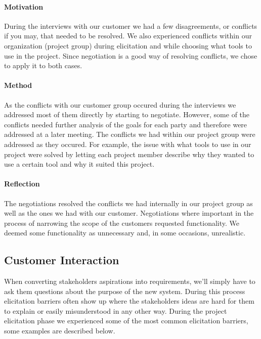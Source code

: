 \documentclass[10pt]{article}
\begin{document}
\paragraph{Motivation}
\hfill \break
During the interviews with our customer we had a few disagreements, or conflicts if you may, that needed to be resolved. We also experienced conflicts within our organization (project group) during elicitation and while choosing what tools to use in the project. Since negotiation is a good way of resolving conflicts, we chose to apply it to both cases.
\paragraph{Method}
\hfill \break
As the conflicts with our customer group occured during the interviews we addressed most of them directly by starting to negotiate. However, some of the conflicts needed further analysis of the goals for each party and therefore were addressed at a later meeting. The conflicts we had within our project group were addressed as they occured. For example, the issue with what tools to use in our project were solved by letting each project member describe why they wanted to use a certain tool and why it suited this project. 

\paragraph{Reflection}
\hfill \break
The negotiations resolved the conflicts we had internally in our project group as well as the ones we had with our customer. Negotiations where important in the process of narrowing the scope of the customers requested functionality. We deemed some functionality as unnecessary and, in some occasions, unrealistic.


\subsection{Customer Interaction}
When converting stakeholders aspirations into requirements, we'll simply have to ask them questions about the purpose of the new system. During this process elicitation barriers often show up where the stakeholders ideas are hard for them to explain or easily misunderstood in any other way.
During the project elicitation phase we experienced some of the most common elicitation barriers, some examples are described below.
\end{document}
